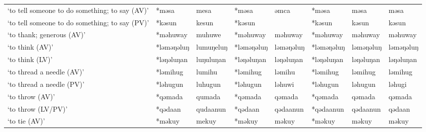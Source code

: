 \begin{landscape}
\begin{longtable}[c]{@{}p{3cm}<{\raggedright}p{2.75cm}<{\raggedright}p{2.75cm}<{\raggedright}p{2.75cm}<{\raggedright}p{2.75cm}<{\raggedright}p{2.75cm}<{\raggedright}p{2.75cm}<{\raggedright}p{2.75cm}<{\raggedright}@{}}
`to tell someone to do something; to say (AV)'       & *məsa              & mesa                           & *məsa              & əmca                       & *məsa            & məsa                     & məsa                              \\
`to tell someone to do something; to say (PV)'       & *kəsun             & kesun                          & *kəsun             &                            & *kəsun           & kəsun                    & kəsun                             \\
`to thank; generous (AV)'                            & *məhuway           & muhuwe                         & *məhuway           & məhuway                    & *məhuway         & məhuway                  & məhuway                           \\
`to think (AV)'                                      & *ləməŋəluŋ         & lumuŋeluŋ                      & *ləməŋəluŋ         & ləməŋəluŋ                  & *ləməŋəluŋ       & ləməŋəluŋ                & ləməŋəluŋ                         \\
`to think (LV)'                                      & *ləŋəluŋan         & luŋuluŋan                      & *ləŋəluŋan         & ləŋəluŋan                  & *ləŋəluŋan       & ləŋəluŋan                & ləŋəluŋan                         \\
`to thread a needle (AV)'                            & *ləmihug           & lumihu                         & *ləmihug           & ləmihu                     & *ləmihug         & ləmihug                  & ləmihug                           \\
`to thread a needle (PV)'                            & *ləhugun           & luhugun                        & *ləhugun           & ləhuwi                     & *ləhugun         & ləhugun                  & ləhugi                            \\
`to throw (AV)'                                      & *qəmada            & qumada                         & *qəmada            & qəmada                     & *qəmada          & qəmada                   & qəmada                            \\
`to throw (LV/PV)'                                   & *qədaan            & qudaanun                       & *qədaan            & qədaanun                   & *qədaanun        & qədaanun                 & qədaan                            \\
`to tie (AV)'                                        & *məkuy             & mekuy                          & *məkuy             & məkuy                      & *məkuy           & məkuy                    & məkuy                             \\

\end{longtable}
\end{landscape}
